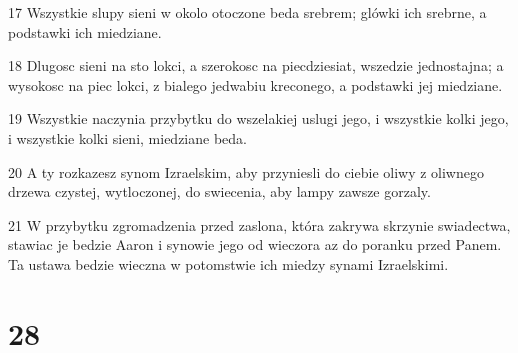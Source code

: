 \par 17 Wszystkie slupy sieni w okolo otoczone beda srebrem; glówki ich srebrne, a podstawki ich miedziane.
\par 18 Dlugosc sieni na sto lokci, a szerokosc na piecdziesiat, wszedzie jednostajna; a wysokosc na piec lokci, z bialego jedwabiu kreconego, a podstawki jej miedziane.
\par 19 Wszystkie naczynia przybytku do wszelakiej uslugi jego, i wszystkie kolki jego, i wszystkie kolki sieni, miedziane beda.
\par 20 A ty rozkazesz synom Izraelskim, aby przyniesli do ciebie oliwy z oliwnego drzewa czystej, wytloczonej, do swiecenia, aby lampy zawsze gorzaly.
\par 21 W przybytku zgromadzenia przed zaslona, która zakrywa skrzynie swiadectwa, stawiac je bedzie Aaron i synowie jego od wieczora az do poranku przed Panem. Ta ustawa bedzie wieczna w potomstwie ich miedzy synami Izraelskimi.

\chapter{28}

